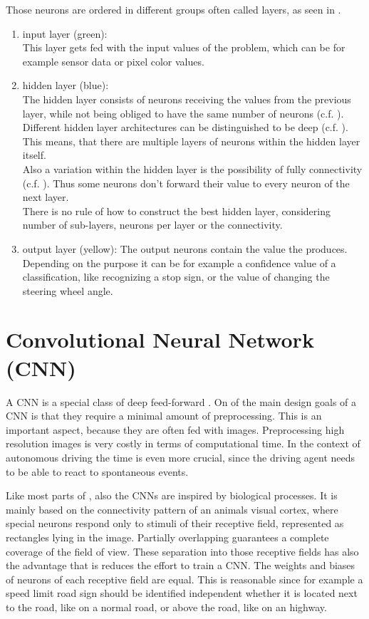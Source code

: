 Those neurons are ordered in different groups often called layers, as seen in .
\begin{enumerate}
	\item input layer (green):\\
		This layer gets fed with the input values of the problem, which can be for example sensor data or pixel color values.
	\item hidden layer (blue):\\
		The hidden layer consists of neurons receiving the values from the previous layer, while not being obliged to have the same number of neurons (c.f. ).
		Different hidden layer architectures can be distinguished to be deep (c.f. ). This means, that there are multiple layers of neurons within the hidden layer itself.\\
		Also a variation within the hidden layer is the possibility of fully connectivity (c.f. ). Thus some neurons don't forward their value to every neuron of the next layer.\\
		There is no rule of how to construct the best hidden layer, considering number of sub-layers, neurons per layer or the connectivity.
	\item output layer (yellow):
		The output neurons contain the value the \nn produces. Depending on the \nns purpose it can be for example a confidence value of a classification, like recognizing a stop sign, or the value of changing the steering wheel angle. 
\end{enumerate}


\section{Convolutional Neural Network (CNN)}\label{sec:CNN}

A CNN is a special class of deep feed-forward \nns. On of the main design goals of a CNN is that they require a minimal amount of preprocessing. This is an important aspect, because they are often fed with images. Preprocessing high resolution images is very costly in terms of computational time. In the context of autonomous driving the time is even more crucial, since the driving agent needs to be able to react to spontaneous events.

Like most parts of \nns, also the CNNs are inspired by biological processes. It is mainly based on the connectivity pattern of an animals visual cortex, where special neurons respond only to stimuli of their receptive field, represented as rectangles lying in the image. Partially overlapping guarantees a complete coverage of the field of view. \cite{wiki:CNN}
These separation into those receptive fields has also the advantage that is reduces the effort to train a CNN. The weights and biases of neurons of each receptive field are equal. This is reasonable since for example a speed limit road sign should be identified independent whether it is located next to the road, like on a normal road, or above the road, like on an highway. %

